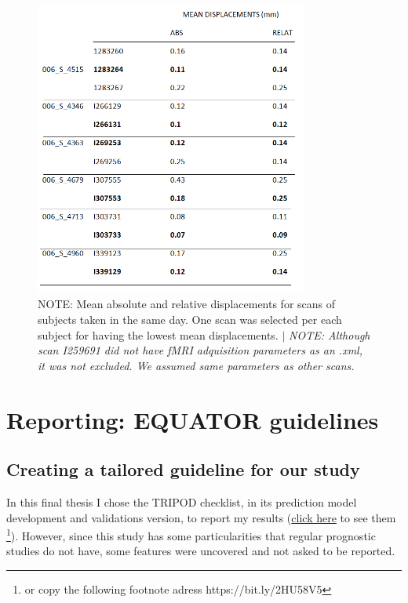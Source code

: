 \FloatBarrier
\begin{figure}[h]
	\centering
	\includegraphics[width=0.8\textwidth]{fig_escans_displacements.png}
	\caption{NOTE: Mean absolute and relative displacements for scans of subjects taken in the same day. One scan was selected per each subject for having the lowest mean displacements. $|$ \textit{NOTE: Although scan I259691 did not have fMRI adquisition parameters as an .xml, it was not excluded. We assumed same parameters as other scans.}}
	\label{fig:escans_displacements}
\end{figure}
\FloatBarrier
\clearpage















\section{Reporting: EQUATOR guidelines} \label {equator_guidelines}

\subsection{Creating a tailored guideline for our study}
In this final thesis I chose the {TRIPOD checklist, in its prediction model development and validations version}, to report my results (\href{https://bit.ly/2HU58V5}{click here} to see them \footnote{or copy the following footnote adress https://bit.ly/2HU58V5}). However, since this study has some particularities that regular prognostic studies do not have, some features were uncovered and not asked to be reported. 

